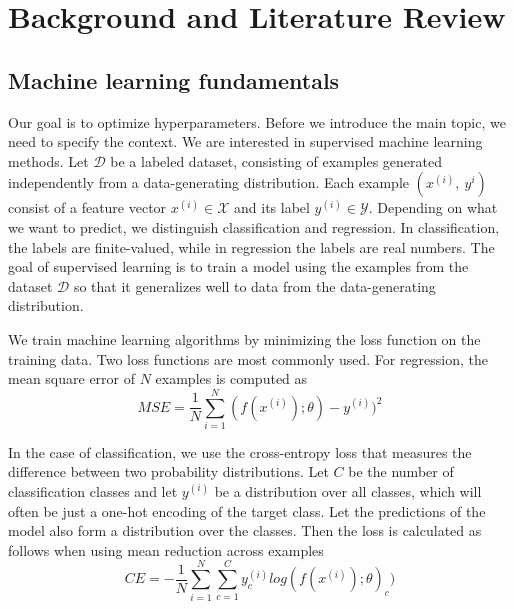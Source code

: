 \chapter{Background and Literature Review}

\label{chap:refs}

\section{Machine learning fundamentals}



Our goal is to optimize hyperparameters. Before we introduce the main topic, we need to specify the context. We are interested in supervised machine learning methods. Let $\mathcal{D}$ be a labeled dataset, consisting of examples generated independently from a data-generating distribution. Each example $(x^{(i)}, \  y^{i})$ consist of a feature vector $x^{(i)}\in \mathcal{X}$ and its label $y^{(i)}\in \mathcal{Y}$. Depending on what we want to predict, we distinguish classification and regression. In classification, the labels are finite-valued, while in regression the labels are real numbers. The goal of supervised learning is to train a model using the examples from the dataset $\mathcal{D}$ so that it generalizes well to data from the data-generating distribution.  %

We train machine learning algorithms by minimizing the loss function on the training data. Two loss functions are most commonly used. For regression, the mean square error of $N$ examples is computed as $$ MSE=\frac{1}{N} \sum_{i=1}^{N} (f(x^{(i)});\theta )-y^{(i)})^2$$


In the case of classification, we use the cross-entropy loss that measures the difference between two probability distributions. Let $C$ be the number of classification classes and let $y^{(i)}$ be a distribution over all classes, which will often be just a one-hot encoding of the target class. Let the predictions of the model also form a distribution over the classes. Then the loss is calculated as follows when using mean reduction across examples $$CE=-\frac{1}{N} \sum_{i=1}^{N} \sum_{c=1}^{C} y^{(i)}_c log(f(x^{(i)});\theta )_c) $$

